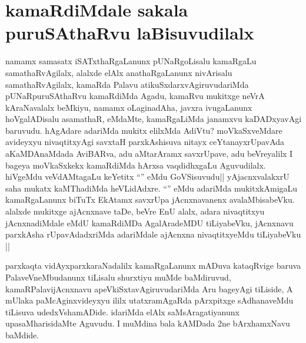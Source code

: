 \section*{kamaRdiMdale sakala puruSAthaRvu laBisuvudilalx}
\begin{artha}
namamx samasatx iSATxthaRgaLanunx pUNaRgoLisalu kamaRgaLu samathaRvAgilalx, alalxde elAlx anathaRgaLanunx nivArisalu samathaRvAgilalx, kamaRda Palavu atikuSxdarxvAgiruvudariMda pUNaRpuruSAthaRvu kamaRdiMda Agadu, kamaRvu mukitxge neVrA kAraNavalalx beMkiyu, namamx oLaginadAha, javxra ivugaLanunx hoVgalADisalu asamathaR, eMdaMte, kamaRgaLiMda janamxvu kaDADxyavAgi baruvudu. hAgAdare adariMda mukitx elilxMda AdiVtu? moVkaSxveMdare avideyxyu nivaqtitxyAgi savxtaH parxkAshisuva nitayx ceYtanayxrUpavAda aKaMDAnaMdada AviBARva, adu aMtarAramx savxrUpave, adu beVreyalilx I bageya moVkaSxkekx kamaRdiMda hArxsa vaqdidhxgaLu Aguvudilalx. hiVgeMdu veVdAMtagaLu keYetitx ``\stext'' eMdu GoVSisuvudu|| yAjacnxvalakxrU saha mukatx kaMThadiMda heVLidAdxre. ``\stext'' eMdu adariMda mukitxkAmigaLu kamaRgaLanunx biTuTx EkAtamx savxrUpa jAcnxnavanenx avalaMbisabeVku. alalxde mukitxge ajAcnxnave taDe, beVre EnU alalx, adara nivaqtitxyu jAcnxnadiMdale eMdU kamaRdiMDa AgalAradeMDU tiLiyabeVku, jAcnxnavu parxkAsha rUpavAdadxriMda adariMdale ajAcnxna nivaqtitxyeMdu tiLiyabeVku ||
\end{artha}

\begin{artha}
parxkaqta vidAyxparxkaraNadalilx kamaRgaLanunx mADuva kataqRvige baruva PalaveVneMbudanunx tiLisalu shurxtiyu muMde baMdiruvud, kamaRPalavijAcnxnavu apeVkiSxtavAgiruvudariMda Aru bageyAgi tiLiside, A mUlaka paMcAginxvideyxyu ililx utatxramAgaRda pArxpitxge sAdhanaveMdu tiLisuva udedxVshamADide. idariMda elAlx saMsAragatiyanunx upasaMharisidaMte Aguvudu. I muMdina bala kAMDada 2ne bArxhamxNavu baMdide.
\end{artha}

